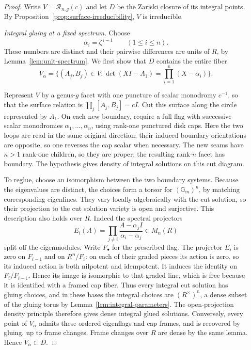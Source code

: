 \begin{proof}
Write $V=\mathcal R_{n,g}(c)$ and let $D$ be the Zariski closure of its
integral points.  By Proposition~\ref{prop:surface-irreducibility}, $V$
is irreducible.

\smallskip\noindent\emph{Integral gluing at a fixed spectrum.}
Choose
\[
 \alpha_i=\zeta^{\,i-1}\qquad(1\le i\le n).
\]
These numbers are distinct and their pairwise differences are units of
$R$, by Lemma~\ref{lem:unit-spectrum}.  We first show that $D$ contains
the entire fiber
\[
 V_\alpha=\{(A_j,B_j)\in V:
            \det(XI-A_1)=\prod_{i=1}^n(X-\alpha_i)\}.
\]

Represent $V$ by a genus-$g$ facet with one puncture of scalar
monodromy $c^{-1}$, so that the surface relation is
$\prod_j[A_j,B_j]=cI$.
Cut this surface along the circle represented by $A_1$.  On each new
boundary, require a full flag with successive scalar monodromies
$\alpha_1,\ldots,\alpha_n$, using rank-one punctured disk caps.  Here
the two loops are read in the same original direction; their induced
boundary orientations are opposite, so one reverses the cap scalar
when necessary.  The new seams have $n>1$ rank-one children, so they
are proper; the resulting rank-$n$ facet has boundary.  The
hypothesis gives density of integral solutions on this cut diagram.

To reglue, choose an isomorphism between the two boundary systems.
Because the eigenvalues are distinct, the choices form a torsor for
$(\mathbb G_m)^n$, by matching corresponding eigenlines.  They vary
locally algebraically with the cut solution, so their projection to
the cut solution variety is open and surjective.
This description also holds over $R$.  Indeed the spectral projectors
\begin{equation}\label{eq:spectral-projectors}
 E_i(A)=\prod_{j\ne i}\frac{A-\alpha_jI}{\alpha_i-\alpha_j}
 \in M_n(R)
\end{equation}
split off the eigenmodules.  Write $F_\bullet$ for the prescribed
flag.  The projector $E_i$ is zero on $F_{i-1}$ and on $R^n/F_i$:
on each of their graded pieces its action is zero, so its induced
action is both nilpotent and idempotent.  It induces the identity on
$F_i/F_{i-1}$.  Hence its image is isomorphic to that graded line,
which is free because it is identified with a framed cap fiber.
Thus every integral cut
solution has gluing choices, and in these bases the integral choices
are $(R^\times)^n$, a dense subset of the gluing torus by
Lemma~\ref{lem:integral-parameters}.
The open-projection density principle therefore gives dense integral
glued solutions.  Conversely, every point of $V_\alpha$ admits these
ordered eigenflags and cap frames, and is recovered by gluing, up to
frame changes.  Frame changes over $R$ are dense by the same lemma.  Hence
$V_\alpha\subset D$.


\end{proof}
